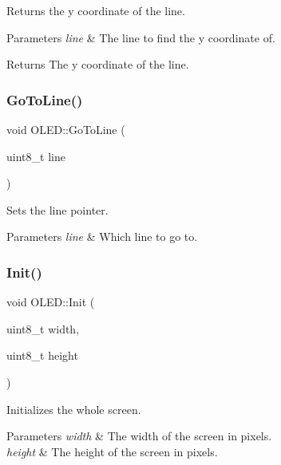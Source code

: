 Returns the y coordinate of the line. 
\begin{DoxyParams}{Parameters}
{\em line} & The line to find the y coordinate of. \\
\hline
\end{DoxyParams}
\begin{DoxyReturn}{Returns}
The y coordinate of the line. 
\end{DoxyReturn}
\hypertarget{class_o_l_e_d_a8d314130676b104ed959b92ab4bac25e}{}\label{class_o_l_e_d_a8d314130676b104ed959b92ab4bac25e} 
\subsubsection{\texorpdfstring{Go\+To\+Line()}{GoToLine()}}
{\footnotesize\ttfamily void O\+L\+E\+D\+::\+Go\+To\+Line (\begin{DoxyParamCaption}\item[{uint8\+\_\+t}]{line }\end{DoxyParamCaption})}

Sets the line pointer. 
\begin{DoxyParams}{Parameters}
{\em line} & Which line to go to. \\
\hline
\end{DoxyParams}
\hypertarget{class_o_l_e_d_a2c8205c8eac9d7a2b181657561e9b4d2}{}\label{class_o_l_e_d_a2c8205c8eac9d7a2b181657561e9b4d2} 
\subsubsection{\texorpdfstring{Init()}{Init()}}
{\footnotesize\ttfamily void O\+L\+E\+D\+::\+Init (\begin{DoxyParamCaption}\item[{uint8\+\_\+t}]{width,  }\item[{uint8\+\_\+t}]{height }\end{DoxyParamCaption})}

Initializes the whole screen. 
\begin{DoxyParams}{Parameters}
{\em width} & The width of the screen in pixels. \\
\hline
{\em height} & The height of the screen in pixels. \\
\hline
\end{DoxyParams}
\hypertarget{class_o_l_e_d_a3efa34861b4ae0bc5323f6b7cf1d8a01}{}\label{class_o_l_e_d_a3efa34861b4ae0bc5323f6b7cf1d8a01} 

